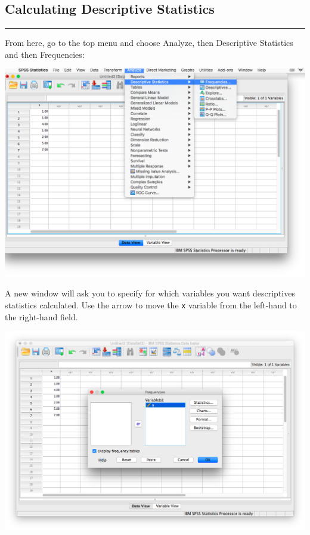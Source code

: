 \documentclass[
]{book}
\begin{document}
\hypertarget{calculating-descriptive-statistics}{%
\subsection{Calculating Descriptive Statistics}\label{calculating-descriptive-statistics}}

\begin{center}\rule{0.5\linewidth}{0.5pt}\end{center}

From here, go to the top menu and choose {Analyze}, then {Descriptive Statistics} and then {Frequencies}:

\includegraphics{img/2.4.12.png}

A new window will ask you to specify for which variables you want descriptives statistics calculated. Use the arrow to move the \texttt{x} variable from the left-hand to the right-hand field.

\includegraphics{img/2.4.13.png}
\end{document}
